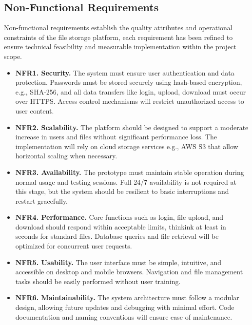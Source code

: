 \subsection{Non-Functional Requirements}
Non-functional requirements establish the quality attributes and operational constraints of the file storage platform, each requirement has been refined to ensure technical feasibility and measurable implementation within the project scope.

\begin{itemize}
    \item \textbf{NFR1. Security.} 
    The system must ensure user authentication and data protection. Passwords must be stored securely using hash-based encryption, e.g., SHA-256, and all data transfers like login, upload, download must occur over HTTPS. Access control mechanisms will restrict unauthorized access to user content.

    \item \textbf{NFR2. Scalability.}
    The platform should be designed to support a moderate increase in users and files without significant performance loss. The implementation will rely on cloud storage services e.g., AWS S3 that allow horizontal scaling when necessary.

    \item \textbf{NFR3. Availability.}
    The prototype must maintain stable operation during normal usage and testing sessions. Full 24/7 availability is not required at this stage, but the system should be resilient to basic interruptions and restart gracefully.

    \item \textbf{NFR4. Performance.}
    Core functions such as login, file upload, and download should respond within acceptable limits, thinkink at least in seconds for standard files. Database queries and file retrieval will be optimized for concurrent user requests.

    \item \textbf{NFR5. Usability.}
    The user interface must be simple, intuitive, and accessible on desktop and mobile browsers. Navigation and file management tasks should be easily performed without user training.

    \item \textbf{NFR6. Maintainability.}
    The system architecture must follow a modular design, allowing future updates and debugging with minimal effort. Code documentation and naming conventions will ensure ease of maintenance.


\end{itemize}
